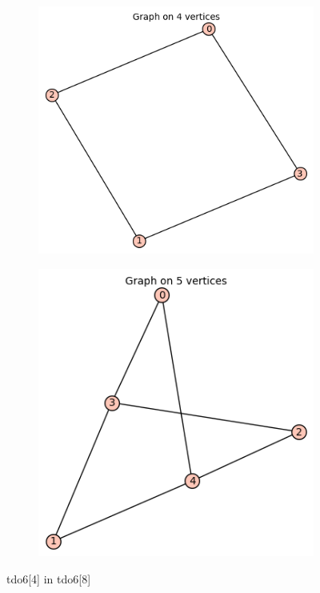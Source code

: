\documentclass[12pt, a4paper]{article}
\begin{document}
\begin{center}
\begin{figure}[!htb]
\centering
\begin{subfigure}{0.5\textwidth}
  \centering
  \includegraphics[width=0.5\linewidth]{tdo6[4]}
\end{subfigure}%
\begin{subfigure}{0.5\textwidth}
  \centering
  \includegraphics[width=0.5\linewidth]{tdo6[8]}
\end{subfigure}
\caption{tdo6[4] in tdo6[8]}
\label{fig:test}
\end{figure}


\end{center}
\end{document}
